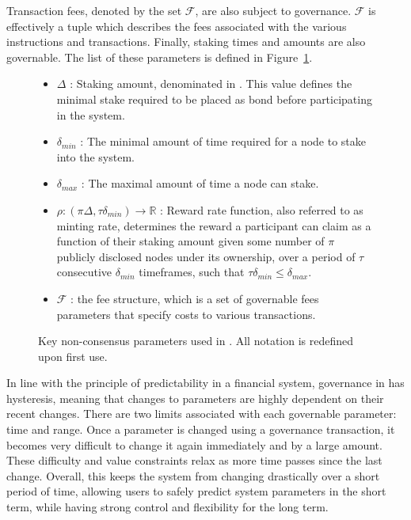 \documentclass[runningheads]{llncs}
\begin{document}
Transaction fees, denoted by the set $\mathcal{F}$, are also subject to governance. 
$\mathcal{F}$ is effectively a tuple which describes the fees associated with the various instructions and transactions. 
Finally, staking times and amounts are also governable. 
The list of these parameters is defined in Figure~\ref{fig:notation}.

\begin{figure}[hbtp]
\begin{framed}
\begin{itemize}
\item{$\Delta$} : Staking amount, denominated in \AVATokenName{}. This value defines the minimal stake required to be placed as bond before participating in the system.
\item{$\delta_{min}$} : The minimal amount of time required for a node to stake into the system.
\item{$\delta_{max}$} : The maximal amount of time a node can stake.
\item{$\rho: (\pi\Delta,\tau\delta_{min}) \rightarrow \mathbb{R}$} : Reward rate function, also referred to as minting rate, determines the reward a participant can claim as a function of their staking amount given some number of $\pi$ publicly disclosed nodes under its ownership, over a period of $\tau$ consecutive $\delta_{min}$ timeframes, such that $\tau\delta_{min} \leq \delta_{max}$. 
\item{$\mathcal{F}$} : the fee structure, which is a set of governable fees parameters that specify costs to various transactions.
\end{itemize}
\end{framed}
\caption{Key non-consensus parameters used in \AVAPlatformName{}. All notation is redefined upon first use.}
\label{fig:notation}
\end{figure}

In line with the principle of predictability in a financial system, governance in \AVATokenName{} has hysteresis, meaning that changes to parameters are highly dependent on their recent changes. There are two limits associated with each governable parameter: time and range. Once a parameter is changed using a governance transaction, it becomes very difficult to change it again immediately and by a large amount. These difficulty and value constraints relax as more time passes since the last change. 
Overall, this keeps the system from changing drastically over a short period of time, allowing users to safely predict system parameters in the short term, while having strong control and flexibility for the long term.
\end{document}

